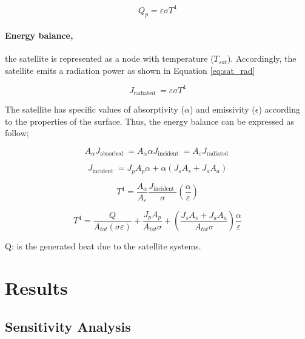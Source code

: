 \documentclass[11pt]{article}
\begin{document}
\begin{equation}\label{eq:palnet_rad}
    Q_p = \varepsilon \sigma T^4
\end{equation}


\paragraph{Energy balance,} the satellite is represented as a node with temperature ($T_{sat}$). Accordingly, the satellite emits a radiation power as shown in Equation \ref{eq:sat_rad}

\begin{equation}\label{eq:sat_rad}
    J_{\text {radiated }} = \varepsilon \sigma T^4
\end{equation}

The satellite has specific values of absorptivity ($\alpha$) and emissivity ($\epsilon$) according to the properties of the surface. Thus, the energy balance can be expressed as follow; 

\begin{equation}
A_\alpha J_{\text {absorbed }}=A_\alpha \alpha J_{\text {incident }}=A_{\varepsilon} J_{\text {radiated }}
\end{equation}


\begin{equation}
J_{\text {incident }} = J_p A_p \alpha +\alpha \left(J_s A_s+J_a A_a\right)
\end{equation}


\begin{equation}
T^4=\frac{A_\alpha}{A_{\varepsilon}} \frac{J_{\text {incident }}}{\sigma}\left(\frac{\alpha}{\varepsilon}\right)
\end{equation} 


\begin{equation}
T^4=\frac{Q}{A_{t o t}(\sigma \varepsilon)}+\frac{J_p A_p}{A_{t o t} \sigma}+\left(\frac{J_s A_s+J_a A_a}{A_{t o t} \sigma}\right) \frac{\alpha}{\varepsilon}
\end{equation}

Q: is the generated heat due to the satellite systems.


 
\newpage
\section{Results} %
\indent

\subsection{Sensitivity Analysis}
\end{document}
